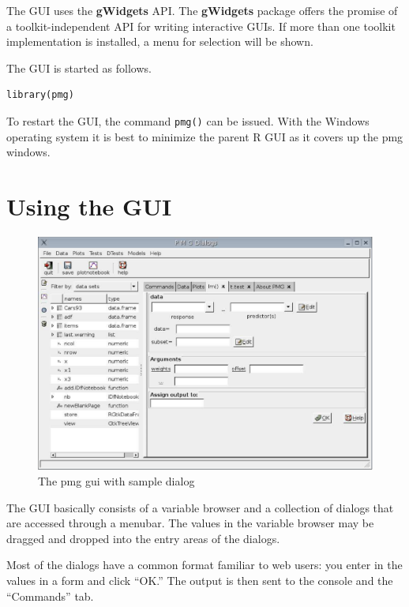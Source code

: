 \documentclass[12pt]{article}
\newcommand{\RFunc}[1]{\texttt{#1()}}
\newcommand{\RPackage}[1]{\textbf{#1}}
\begin{document}
The GUI uses the \RPackage{gWidgets} API. The \RPackage{gWidgets}
package offers the promise of a toolkit-independent API for writing
interactive GUIs. If more than one toolkit implementation is
installed, a menu for selection will be shown. 

The GUI is started as follows.
\begin{verbatim}
library(pmg)
\end{verbatim}

To restart the GUI, the command \RFunc{pmg} can be issued. With the
Windows operating system it is best to minimize the parent R GUI as it
covers up the pmg windows.

\section{Using the GUI}

\begin{figure}[htbp]
  \centering
  \includegraphics[width=.8\textwidth]{pmg-sample-dialog}
  \caption{The pmg gui with sample dialog}
  \label{fig:pmg-gui-sample-dialog}
\end{figure}


The GUI basically consists of a variable browser and a collection of
dialogs that are accessed through a menubar. The values in the
variable browser may be dragged and dropped into the entry areas of
the dialogs. 

Most of the dialogs have a common format familiar to web users: you
enter in the values in a form and click ``OK.'' The output is then
sent to the console and the ``Commands'' tab.
\end{document}
